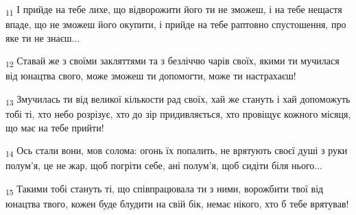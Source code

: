 \begin{tcolorbox}
\textsubscript{11} І прийде на тебе лихе, що відворожити його ти не зможеш, і на тебе нещастя впаде, що не зможеш його окупити, і прийде на тебе раптовно спустошення, про яке ти не знаєш...
\end{tcolorbox}
\begin{tcolorbox}
\textsubscript{12} Ставай же з своїми закляттями та з безліччю чарів своїх, якими ти мучилася від юнацтва свого, може зможеш ти допомогти, може ти настрахаєш!
\end{tcolorbox}
\begin{tcolorbox}
\textsubscript{13} Змучилась ти від великої кількости рад своїх, хай же стануть і хай допоможуть тобі ті, хто небо розрізує, хто до зір придивляється, хто провіщує кожного місяця, що має на тебе прийти!
\end{tcolorbox}
\begin{tcolorbox}
\textsubscript{14} Ось стали вони, мов солома: огонь їх попалить, не врятують своєї душі з руки полум'я, це не жар, щоб погріти себе, ані полум'я, щоб сидіти біля нього...
\end{tcolorbox}
\begin{tcolorbox}
\textsubscript{15} Такими тобі стануть ті, що співпрацювала ти з ними, ворожбити твої від юнацтва твого, кожен буде блудити на свій бік, немає нікого, хто б тебе врятував!
\end{tcolorbox}
